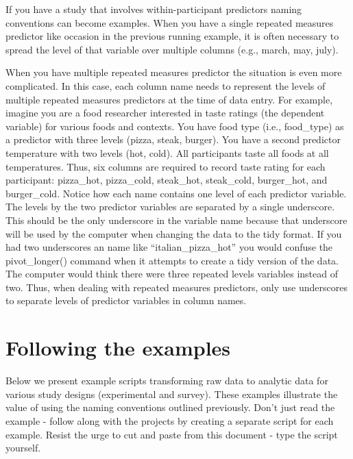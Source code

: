 \documentclass[
]{krantz}
\begin{document}
If you have a study that involves within-participant predictors naming conventions can become examples. When you have a single repeated measures predictor like occasion in the previous running example, it is often necessary to spread the level of that variable over multiple columns (e.g., march, may, july).

When you have multiple repeated measures predictor the situation is even more complicated. In this case, each column name needs to represent the levels of multiple repeated measures predictors at the time of data entry. For example, imagine you are a food researcher interested in taste ratings (the dependent variable) for various foods and contexts. You have food type (i.e., food\_type) as a predictor with three levels (pizza, steak, burger). You have a second predictor temperature with two levels (hot, cold). All participants taste all foods at all temperatures. Thus, six columns are required to record taste rating for each participant: pizza\_hot, pizza\_cold, steak\_hot, steak\_cold, burger\_hot, and burger\_cold. Notice how each name contains one level of each predictor variable. The levels by the two predictor variables are separated by a single underscore. This should be the only underscore in the variable name because that underscore will be used by the computer when changing the data to the tidy format. If you had two underscores an name like ``italian\_pizza\_hot'' you would confuse the pivot\_longer() command when it attempts to create a tidy version of the data. The computer would think there were three repeated levels variables instead of two. Thus, when dealing with repeated measures predictors, only use underscores to separate levels of predictor variables in column names.

\hypertarget{following-the-examples}{%
\section{Following the examples}\label{following-the-examples}}

Below we present example scripts transforming raw data to analytic data for various study designs (experimental and survey). These examples illustrate the value of using the naming conventions outlined previously. Don't just read the example - follow along with the projects by creating a separate script for each example. Resist the urge to cut and paste from this document - type the script yourself.
\end{document}
